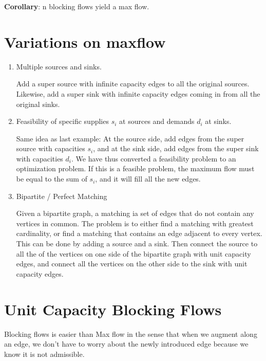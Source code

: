 \documentclass{article}
\begin{document}
  \textbf{Corollary}:
  n blocking flows yield a max flow.
  
  \section{Variations on maxflow}
  \begin{enumerate}
  \item Multiple sources and sinks.
  
  Add a super source with infinite capacity edges to all the original sources. Likewise, add a super sink with infinite capacity edges coming in from all the original sinks.
  
  \item Feasibility of specific supplies $s_i$ at sources and demands $d_i$ at sinks.
  
  Same idea as last example: At the source side, add edges from the super source with capacities $s_i$, and at the sink side, add edges from the super sink with capacities $d_i$. We have thus converted a feasibility problem to an optimization problem. If this is a feasible problem, the maximum flow must be equal to the sum of $s_i$, and it will fill all the new edges.
  
  \item Bipartite / Perfect Matching
  
  Given a bipartite graph, a matching ia set of edges that do not contain any vertices in common. The problem is to either find a matching with greatest cardinality, or find a matching that contains an edge adjacent to every vertex.  This can be done by adding a  source and a sink. Then connect the source to all the of the vertices on one side of the bipartite graph with unit capacity edges, and connect all the vertices on the other side to the sink with unit capacity edges.
  
  
  
  \end{enumerate}
  \section{Unit Capacity Blocking Flows}
  Blocking flows is easier than Max flow in the sense that when we augment along an edge, we don't have to worry about the newly introduced edge because we know it is not admissible.
  
\end{document}
